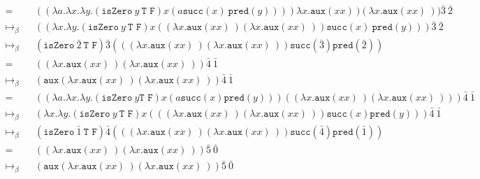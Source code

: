\documentclass[11pt]{article}
\begin{document}
\begin{enumerate}
\begin{align*}
		      =             &  & (( \lambda a. \lambda x. \lambda y. ( \texttt{isZero} \: y \: \texttt{T F}) x (a \texttt{succ}(x) \: \texttt{pred}(y)))) \lambda x. \texttt{aux}(x x) \:)( \lambda x. \texttt{aux}(x x) \:)) \bar{3} \: \bar{2} & \\
		      \mapsto_\beta &  & (( \lambda x. \lambda y. ( \texttt{isZero} \: y \: \texttt{T F}) x (( \lambda x. \texttt{aux}(x x) \:)( \lambda x. \texttt{aux}(x x) \:)) \texttt{succ}(x)	\: \texttt{pred}(y))) \bar{3} \: \bar{2}              & \\
		      \mapsto_\beta &  & ( \texttt{isZero} \: \bar{2} \: \texttt{T F}) \bar{3} ((( \lambda x. \texttt{aux}(x x) \:)( \lambda x. \texttt{aux}(x x) \:)) \texttt{succ}( \bar{3} )	\texttt{pred}( \bar{2} ))                                 & \\
		      =             &  & (( \lambda x. \texttt{aux}(x x) \:)( \lambda x. \texttt{aux}(x x) \:)) \bar{4} \: \bar{1}                                                                                                                       & \\
		      \mapsto_\beta &  & ( \texttt{aux}( \lambda x. \texttt{aux}(x x) \:)( \lambda x. \texttt{aux}(x x) \:)) \bar{4} \: \bar{1}                                                                                                          & \\
		      =             &  & (( \lambda a. \lambda x. \lambda y. ( \texttt{isZero} \: y \texttt{T F}) x (a \texttt{succ}(x) \texttt{pred}(y)))(( \lambda x. \texttt{aux}(x x) \:)( \lambda x. \texttt{aux}(x x) \:))) \bar{4} \: \bar{1}     & \\
		      \mapsto_\beta &  & ( \lambda x. \lambda y. ( \texttt{isZero} \: y \: \texttt{T F}) x ((( \lambda x. \texttt{aux}(x x) \:)( \lambda x. \texttt{aux}(x x) \:)) \texttt{succ}(x) \texttt{pred}(y))) \bar{4} \: \bar{1}                & \\
		      \mapsto_\beta &  & ( \texttt{isZero} \: \bar{1} \: \texttt{T F}) \bar{4} ((( \lambda x. \texttt{aux}(x x) \:)( \lambda x. \texttt{aux}(x x) \:)) \texttt{succ}( \bar{4} ) \texttt{pred}( \bar{1} ))                                & \\
		      =             &  & (( \lambda x. \texttt{aux}(x x) \:)( \lambda x. \texttt{aux}(x x) \:)) \bar{5} \: \bar{0}                                                                                                                       & \\
		      \mapsto_\beta &  & ( \texttt{aux}( \lambda x. \texttt{aux}(x x) \:)( \lambda x. \texttt{aux}(x x) \:)) \bar{5} \: \bar{0}                                                                                                          & \\

\end{align*}
\end{enumerate}
\end{document}
